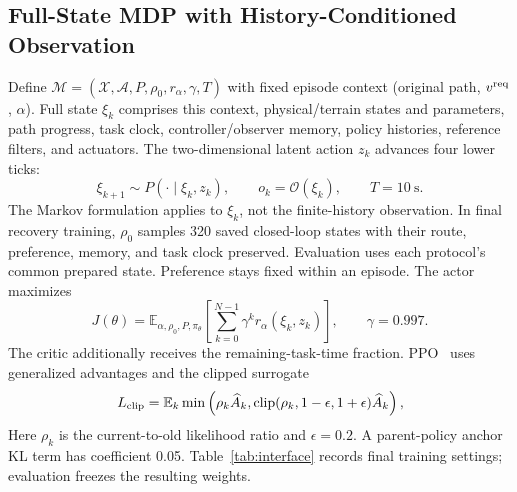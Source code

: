 \documentclass[journal]{IEEEtran}
\newcommand{\clip}{\operatorname{clip}}\newcommand{\sat}{\operatorname{sat}}
\newcommand{\E}{\mathbb E}\newcommand{\ind}{\mathbf1}\newcommand{\pos}[1]{[#1]_+}
\begin{document}
\subsection{Full-State MDP with History-Conditioned Observation}
Define $\mathcal M=(\mathcal X,\mathcal A,P,\rho_0,r_\alpha,\gamma,T)$ with fixed episode context (original path, $v^{\rm req}$, $\alpha$). Full state $\xi_k$ comprises this context, physical/terrain states and parameters, path progress, task clock, controller/observer memory, policy histories, reference filters, and actuators. The two-dimensional latent action $z_k$ advances four lower ticks:
\begin{equation}
 \xi_{k+1}\sim P(\cdot\mid\xi_k,z_k),\qquad
 o_k=\mathcal O(\xi_k),\qquad T=10~\mathrm s.
 \label{eq:mdp}
\end{equation}
The Markov formulation applies to $\xi_k$, not the finite-history observation. In final recovery training, $\rho_0$ samples 320 saved closed-loop states with their route, preference, memory, and task clock preserved. Evaluation uses each protocol's common prepared state. Preference stays fixed within an episode. The actor maximizes
\begin{equation}
 J(\theta)=\E_{\alpha,\rho_0,P,\pi_\theta}
 \left[\sum_{k=0}^{N-1}\gamma^kr_\alpha(\xi_k,z_k)\right],
 \qquad\gamma=0.997.
 \label{eq:objective}
\end{equation}
The critic additionally receives the remaining-task-time fraction. PPO~\cite{schulman2017} uses generalized advantages and the clipped surrogate
\begin{equation}
 L_{\rm clip}=\E_k\min\left(\rho_k\widehat A_k,
 \clip(\rho_k,1-\epsilon,1+\epsilon)\widehat A_k\right),
 \label{eq:ppo}
\end{equation}
Here $\rho_k$ is the current-to-old likelihood ratio and $\epsilon=0.2$. A parent-policy anchor KL term has coefficient 0.05. Table~\ref{tab:interface} records final training settings; evaluation freezes the resulting weights.
\end{document}
